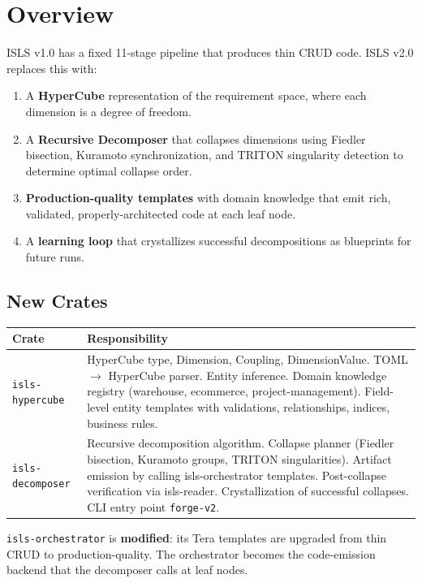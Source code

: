 \documentclass[11pt,a4paper]{article}
\begin{document}
\section{Overview}

ISLS v1.0 has a fixed 11-stage pipeline that produces thin CRUD code.
ISLS v2.0 replaces this with:

\begin{enumerate}
\item A \textbf{HyperCube} representation of the requirement space,
  where each dimension is a degree of freedom.
\item A \textbf{Recursive Decomposer} that collapses dimensions using
  Fiedler bisection, Kuramoto synchronization, and TRITON singularity
  detection to determine optimal collapse order.
\item \textbf{Production-quality templates} with domain knowledge that
  emit rich, validated, properly-architected code at each leaf node.
\item A \textbf{learning loop} that crystallizes successful decompositions
  as blueprints for future runs.
\end{enumerate}

\subsection{New Crates}

\begin{center}
\small
\begin{tabular}{lp{9cm}}
\toprule
\textbf{Crate} & \textbf{Responsibility} \\
\midrule
\texttt{isls-hypercube} & HyperCube type, Dimension, Coupling, DimensionValue.
  TOML $\to$ HyperCube parser. Entity inference. Domain knowledge registry
  (warehouse, ecommerce, project-management). Field-level entity templates
  with validations, relationships, indices, business rules. \\
\texttt{isls-decomposer} & Recursive decomposition algorithm. Collapse planner
  (Fiedler bisection, Kuramoto groups, TRITON singularities). Artifact emission
  by calling isls-orchestrator templates. Post-collapse verification via
  isls-reader. Crystallization of successful collapses. CLI entry point
  \texttt{forge-v2}. \\
\bottomrule
\end{tabular}
\end{center}

\texttt{isls-orchestrator} is \textbf{modified}: its Tera templates are
upgraded from thin CRUD to production-quality. The orchestrator becomes the
code-emission backend that the decomposer calls at leaf nodes.
\end{document}
